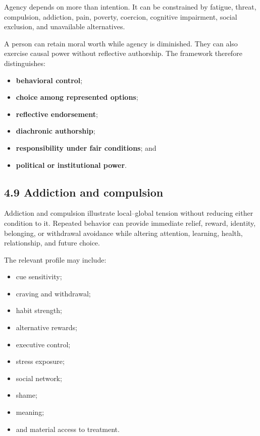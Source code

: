 \documentclass[
  11pt,
]{article}
\providecommand{\tightlist}{%
  \setlength{\itemsep}{0pt}\setlength{\parskip}{0pt}}
\begin{document}
Agency depends on more than intention. It can be constrained by fatigue,
threat, compulsion, addiction, pain, poverty, coercion, cognitive
impairment, social exclusion, and unavailable alternatives.

A person can retain moral worth while agency is diminished. They can
also exercise causal power without reflective authorship. The framework
therefore distinguishes:

\begin{itemize}
\tightlist
\item
  \textbf{behavioral control};
\item
  \textbf{choice among represented options};
\item
  \textbf{reflective endorsement};
\item
  \textbf{diachronic authorship};
\item
  \textbf{responsibility under fair conditions}; and
\item
  \textbf{political or institutional power}.
\end{itemize}

\subsection{4.9 Addiction and
compulsion}\label{addiction-and-compulsion}

Addiction and compulsion illustrate local--global tension without
reducing either condition to it. Repeated behavior can provide immediate
relief, reward, identity, belonging, or withdrawal avoidance while
altering attention, learning, health, relationship, and future choice.

The relevant profile may include:

\begin{itemize}
\tightlist
\item
  cue sensitivity;
\item
  craving and withdrawal;
\item
  habit strength;
\item
  alternative rewards;
\item
  executive control;
\item
  stress exposure;
\item
  social network;
\item
  shame;
\item
  meaning;
\item
  and material access to treatment.
\end{itemize}
\end{document}
